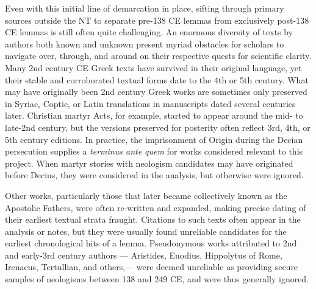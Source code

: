 Even with this initial line of demarcation in place, %
sifting through primary sources outside the NT to separate %
pre-138 CE lemmas from exclusively post-138 CE lemmas is still often quite challenging. %
An enormous diversity of texts by authors both known and unknown %
present myriad obstacles for scholars to navigate over, through, and around %
on their respective quests for scientific clarity. %
Many 2nd century CE Greek texts have survived in their original language, %
yet their stable and corroborated textual forms date to the 4th or 5th century. %
What may have originally been 2nd century Greek works are sometimes %
only preserved in Syriac, Coptic, or Latin translations in manuscripts dated several centuries later. %
Christian martyr Acts, for example, started to appear around the mid- to late-2nd century, %
but the versions preserved for posterity often reflect 3rd, 4th, or 5th century editions. %
In practice, the imprisonment of Origin during the Decian persecution %
supplies a \textit{terminus ante quem} for works considered relevant to this project. %
When martyr stories with neologism candidates may have originated %
before Decius, %
they were considered in the analysis, but otherwise were ignored. %

Other works, particularly those that later became collectively %
known as the Apostolic Fathers, were often re-written and expanded, %
making precise dating of their earliest textual strata fraught. %
Citations to such texts often appear in the analysis or notes, %
but they were usually found unreliable candidates for the earliest chronological hits of a lemma. %
Pseudonymous works attributed to 2nd and early-3rd century authors %
--- Aristides, Euodius, Hippolytus of Rome, Irenaeus, Tertullian, %
and others,--- were deemed unreliable as providing secure samples of neologisms %
between 138 and 249 CE, and were thus generally ignored. %

